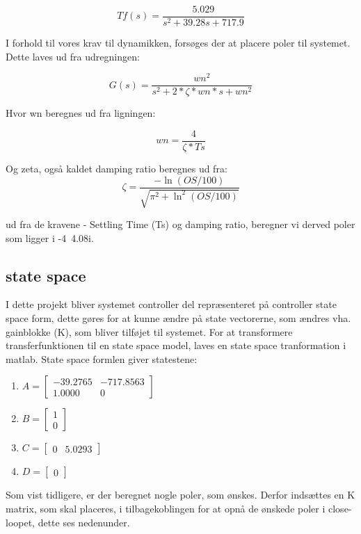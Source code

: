 \begin{equation}
  Tf(s) = \frac{5.029}{s^2 + 39.28 s + 717.9}
\end{equation}

I forhold til vores krav til dynamikken, forsøges der at placere poler til systemet. Dette laves ud fra udregningen: 


\begin{equation}
  G(s) = \frac{wn^2}{s^2+2*\zeta*wn*s+wn^2}
\end{equation}

Hvor wn beregnes ud fra ligningen:

\begin{equation}
  wn = \frac{4}{\zeta*Ts}
\end{equation} 

Og zeta, også kaldet damping ratio beregnes ud fra: 
\begin{equation}
  \zeta = \frac{-\ln(OS/100)}{\sqrt{\pi^2+\ln^2(OS/100)}}
\end{equation} 

ud fra de kravene - Settling Time (Ts) og damping ratio, beregner vi derved poler som ligger i -4\textpm\ 4.08i. 

\subsection{state space}

I dette projekt bliver systemet controller del repræsenteret på controller state space form, dette gøres for at kunne ændre på state vectorerne, som ændres vha. gainblokke (K), som bliver tilføjet til systemet. For at transformere transferfunktionen til en state space model, laves en state space tranformation i matlab. State space formlen giver statestene: 

\begin{enumerate}
 
\item
 $
A = 
\begin{bmatrix}

	-39.2765 & -717.8563 \\
    1.0000     &    0
\end{bmatrix}
     $
\item
 $
B = 
\begin{bmatrix}

	1\\
    0
\end{bmatrix}
     $    
  
\item 
 $
C = 
\begin{bmatrix}

	0  &  5.0293
\end{bmatrix}
     $    
 \item
 $
D = 
\begin{bmatrix}

	0  
\end{bmatrix}
     $  
\end{enumerate}      
Som vist tidligere, er der beregnet nogle poler, som ønskes. Derfor indsættes en K matrix, som skal placeres, i tilbagekoblingen for at opnå de ønskede poler i close-loopet, dette ses nedenunder. 

